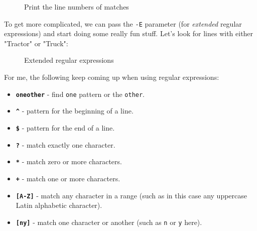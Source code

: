 \documentclass[10pt,american,]{book}
\newenvironment{Shaded}{\begin{snugshade}}{\end{snugshade}}
\newcommand{\KeywordTok}[1]{\textcolor[rgb]{0.13,0.29,0.53}{\textbf{{#1}}}}
\newcommand{\StringTok}[1]{\textcolor[rgb]{0.31,0.60,0.02}{{#1}}}
\newcommand{\NormalTok}[1]{{#1}}
\providecommand{\tightlist}{%
  \setlength{\itemsep}{0pt}\setlength{\parskip}{0pt}}
\numberwithin{figure}{chapter}
\DeclareRobustCommand{\drcap}[1]{\begin{figure}[H]\caption{#1}\end{figure}}
\renewcommand{\KeywordTok}[1]{{#1}}
\renewcommand{\StringTok}[1]{{#1}}
\renewcommand{\NormalTok}[1]{{#1}}
\begin{document}
\drcap{Print the line numbers of matches}

\begin{Shaded}
\end{Shaded}

To get more complicated, we can pass the \texttt{-E} parameter (for
\emph{extended} regular expressions) and start doing some really fun
stuff. Let's look for lines with either "Tractor" or "Truck":

\drcap{Extended regular expressions}

\begin{Shaded}
\end{Shaded}

For me, the following keep coming up when using regular expressions:

\begin{itemize}
\tightlist
\item
  \textbf{\texttt{one\textbar{}other}} - find \texttt{one} pattern or
  the \texttt{other}.
\item
  \textbf{\texttt{\^{}}} - pattern for the beginning of a line.
\item
  \textbf{\texttt{\$}} - pattern for the end of a line.
\item
  \textbf{\texttt{?}} - match exactly one character.
\item
  \textbf{\texttt{*}} - match zero or more characters.
\item
  \textbf{\texttt{+}} - match one or more characters.
\item
  \textbf{\texttt{{[}A-Z{]}}} - match any character in a range (such as
  in this case any uppercase Latin alphabetic character).
\item
  \textbf{\texttt{{[}n\textbar{}y{]}}} - match one character or another
  (such as \texttt{n} or \texttt{y} here).
\end{itemize}
\end{document}

